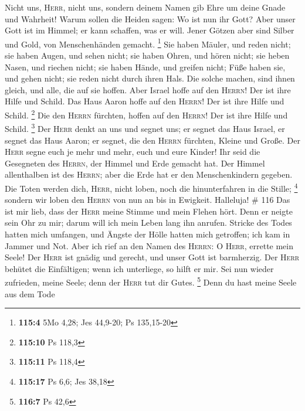  Nicht uns, \textsc{Herr}, nicht uns, sondern deinem Namen
gib Ehre um deine Gnade und Wahrheit!  Warum sollen die
Heiden sagen: Wo ist nun ihr Gott?  Aber unser Gott ist im
Himmel; er kann schaffen, was er will.  Jener Götzen aber
sind Silber und Gold, von Menschenhänden gemacht. \footnote{\textbf{115:4}
  5Mo 4,28; Jes 44,9-20; Ps 135,15-20}  Sie haben Mäuler,
und reden nicht; sie haben Augen, und sehen nicht;  sie
haben Ohren, und hören nicht; sie heben Nasen, und riechen nicht;
 sie haben Hände, und greifen nicht; Füße haben sie, und
gehen nicht; sie reden nicht durch ihren Hals.  Die solche
machen, sind ihnen gleich, und alle, die auf sie hoffen. 
Aber Israel hoffe auf den \textsc{Herrn}! Der ist ihre Hilfe und Schild.
 Das Haus Aaron hoffe auf den \textsc{Herrn}! Der ist
ihre Hilfe und Schild. \footnote{\textbf{115:10} Ps 118,3}
 Die den \textsc{Herrn} fürchten, hoffen auf den
\textsc{Herrn}! Der ist ihre Hilfe und Schild. \footnote{\textbf{115:11}
  Ps 118,4}  Der \textsc{Herr} denkt an uns und segnet
uns; er segnet das Haus Israel, er segnet das Haus Aaron;
 er segnet, die den \textsc{Herrn} fürchten, Kleine und
Große.  Der \textsc{Herr} segne euch je mehr und mehr,
euch und eure Kinder!  Ihr seid die Gesegneten des
\textsc{Herrn}, der Himmel und Erde gemacht hat.  Der
Himmel allenthalben ist des \textsc{Herrn}; aber die Erde hat er den
Menschenkindern gegeben.  Die Toten werden dich,
\textsc{Herr}, nicht loben, noch die hinunterfahren in die Stille;
\footnote{\textbf{115:17} Ps 6,6; Jes 38,18}  sondern wir
loben den \textsc{Herrn} von nun an bis in Ewigkeit. Halleluja! \# 116
 Das ist mir lieb, dass der \textsc{Herr} meine Stimme und
mein Flehen hört.  Denn er neigte sein Ohr zu mir; darum
will ich mein Leben lang ihn anrufen.  Stricke des Todes
hatten mich umfangen, und Ängste der Hölle hatten mich getroffen; ich
kam in Jammer und Not.  Aber ich rief an den Namen des
\textsc{Herrn}: O \textsc{Herr}, errette mein Seele!  Der
\textsc{Herr} ist gnädig und gerecht, und unser Gott ist barmherzig.
 Der \textsc{Herr} behütet die Einfältigen; wenn ich
unterliege, so hilft er mir.  Sei nun wieder zufrieden,
meine Seele; denn der \textsc{Herr} tut dir Gutes. \footnote{\textbf{116:7}
  Ps 42,6}  Denn du hast meine Seele aus dem Tode
